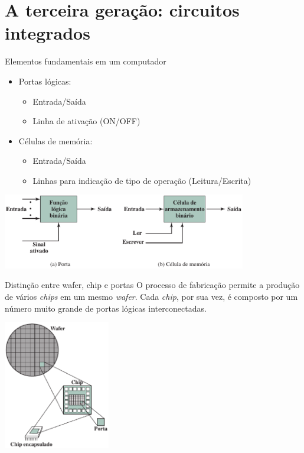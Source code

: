 \section[slide=true]{A terceira geração: circuitos integrados}
\begin{slide}[toc=]{Elementos fundamentais em um computador}
	\begin{itemize}
		\item Portas lógicas:
			\begin{itemize}
				\item Entrada/Saída
				\item Linha de ativação (ON/OFF)
			\end{itemize}
		\item Células de memória:
			\begin{itemize}
				\item Entrada/Saída
				\item Linhas para indicação de tipo de operação (Leitura/Escrita)
			\end{itemize}
	\end{itemize}
	\begin{center}
		\includegraphics[width=0.8\textwidth]{figs/elementos-fundamentais}
	\end{center}
\end{slide}

\begin{slide}[toc=]{Distinção entre wafer, chip e portas}
	O processo de fabricação permite a produção de vários \emph{chips} em um mesmo \emph{wafer}. Cada \emph{chip}, por sua vez, é composto por um número muito grande de portas lógicas interconectadas.

	\begin{center}
		\includegraphics[width=0.35\textwidth]{figs/wafer-chip-porta}
	\end{center}
\end{slide}

